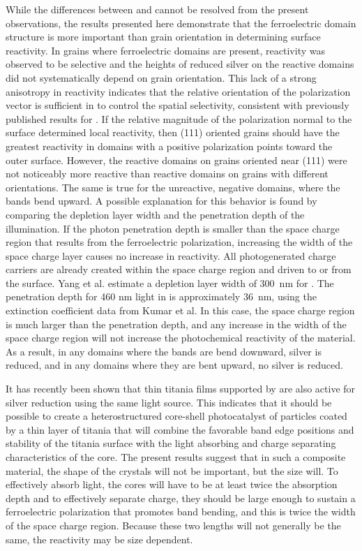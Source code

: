 While the differences between  and  cannot be resolved from the present observations, the results presented here demonstrate that the ferroelectric domain structure is more important than grain orientation in determining surface reactivity. In grains where ferroelectric domains are present, reactivity was observed to be selective and the heights of reduced silver on the reactive domains did not systematically depend on grain orientation. This lack of a strong anisotropy in reactivity indicates that the relative orientation of the polarization vector is sufficient in  to control the spatial selectivity, consistent with previously published results for .\cite{Burbure:2010tt} If the relative magnitude of the polarization normal to the surface determined local reactivity, then (111) oriented  grains should have the greatest reactivity in domains with a positive polarization points toward the outer surface. However, the reactive domains on grains oriented near (111) were not noticeably more reactive than reactive domains on grains with different orientations. The same is true for the unreactive, negative domains, where the bands bend upward. A possible explanation for this behavior is found by comparing the depletion layer width and the penetration depth of the illumination. If the photon penetration depth is smaller than the space charge region that results from the ferroelectric polarization, increasing the width of the space charge layer causes no increase in reactivity. All photogenerated charge carriers are already created within the space charge region and driven to or from the surface. Yang et al.\cite{Yang:2009hl} estimate a depletion layer width of \SI{300}{\nano\meter} for . The penetration depth for 460 nm light in  is approximately \SI{36}{\nano\meter}, using the extinction coefficient data from Kumar et al. \cite{Kumar:2008fr} In this case, the space charge region is much larger than the penetration depth, and any increase in the width of the space charge region will not increase the photochemical reactivity of the material. As a result, in any domains where the bands are bend downward, silver is reduced, and in any domains where they are bent upward, no silver is reduced.

It has recently been shown that thin titania films supported by  are also active for silver reduction using the same light source.\cite{Zhang:2011cj} This indicates that it should be possible to create a heterostructured core-shell photocatalyst of  particles coated by a thin layer of titania that will combine the favorable band edge positions and stability of the titania surface with the light absorbing and charge separating characteristics of the  core. The present results suggest that in such a composite material, the shape of the  crystals will not be important, but the size will. To effectively absorb light, the cores will have to be at least twice the absorption depth and to effectively separate charge, they should be large enough to sustain a ferroelectric polarization that promotes band bending, and this is twice the width of the space charge region. Because these two lengths will not generally be the same, the reactivity may be size dependent.

